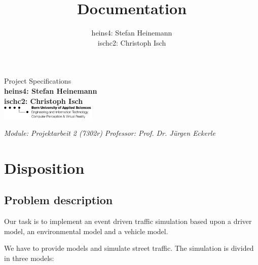 \documentclass[a4paper,10pt,titlepage]{article}
\title{Documentation}
\author{heins4: Stefan Heinemann\\ischc2: Christoph Isch}
\begin{document}
\begin{titlepage}
{\huge Project Specifications}\\
\textbf{heins4: Stefan Heinemann}\\
\textbf{ischc2: Christoph Isch}\\
\newline\newline\newline\newline\newline
\newline\newline\newline\newline\newline\newline\newline\newline\newline
\newline\newline\newline\newline\newline\newline\newline\newline
\includegraphics[width=46mm]{logo_ti.png}\newline

\emph{Module: Projektarbeit 2 (7302r)}\newline
\emph{Professor: Prof. Dr. Jürgen Eckerle}

\end{titlepage}


\tableofcontents


\newpage

\section{Disposition}

\subsection{Problem description}
Our task is to implement an event driven traffic simulation based upon a driver model, an environmental model and a vehicle model.


We have to provide models and simulate street traffic. 
The simulation is divided in three models:
\end{document}

